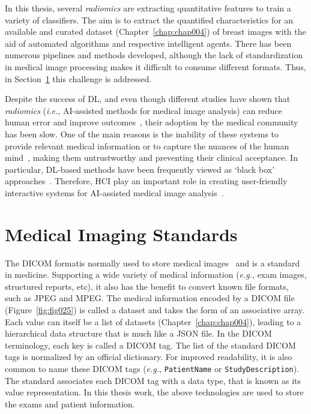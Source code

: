 In this thesis, several {\it radiomics} are extracting quantitative features to train a variety of classifiers.
The aim is to extract the quantified characteristics for an available and curated dataset (Chapter~\ref{chap:chap004}) of breast images with the aid of automated algorithms and respective intelligent agents.
There has been numerous pipelines and methods developed, although the lack of standardization in medical image processing makes it difficult to consume different formats.
Thus, in Section~\ref{sec:chap002007} this challenge is addressed.

Despite the success of \ac{DL}, and even though different studies have shown that {\it radiomics} ({\it i.e.}, \ac{AI}-assisted methods for medical image analysis) can reduce human error and improve outcomes~\cite{Cai:2019:HTC:3290605.3300234, delvaux2017effects, middleton2016clinical}, their adoption by the medical community has been slow.
One of the main reasons is the inability of these systems to provide relevant medical information or to capture the nuances of the human mind~\cite{khairat2018reasons, kohli2018cad, 10.1145/2858036.2858373}, making them untrustworthy and preventing their clinical acceptance.
In particular, \ac{DL}-based methods have been frequently viewed as `black box' approaches~\cite{litjens2017survey}.
Therefore, \ac{HCI} play an important role in creating user-friendly interactive systems for \ac{AI}-assisted medical image analysis~\cite{10.1145/3132272.3134111}.

\section{Medical Imaging Standards}
\label{sec:chap002007}

The \ac{DICOM} format\footnotemark[7] is normally used to store medical images~\cite{Trivedi2019} and is a standard in medicine.
Supporting a wide variety of medical information ({\it e.g.}, exam images, structured reports, etc), it also has the benefit to convert known file formats, such as \ac{JPEG} and \ac{MPEG}.
The medical information encoded by a \ac{DICOM} file (Figure~\ref{fig:fig025}) is called a dataset and takes the form of an associative array.
Each value can itself be a list of datasets (Chapter~\ref{chap:chap004}), leading to a hierarchical data structure that is much like a \ac{JSON} file.
In the \ac{DICOM} terminology, each key is called a \ac{DICOM} tag.
The list of the standard \ac{DICOM} tags is normalized by an official dictionary.
For improved readability, it is also common to name these \ac{DICOM} tags ({\it e.g.}, \texttt{PatientName} or \texttt{StudyDescription}).
The standard associates each \ac{DICOM} tag with a data type, that is known as its value representation.
In this thesis work, the above technologies are used to store the exams and patient information.

